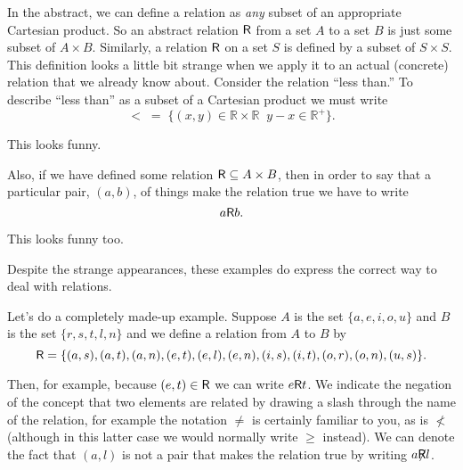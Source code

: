 \documentclass[10pt,]{book}
\theoremstyle{plain}
\theoremstyle{definition}
\theoremstyle{definition}
\numberwithin{equation}{section}
\newcommand{\suchthat}{\;  \;}
\newcommand{\Reals}{{\mathbb R}}
\newcommand{\relR}{\mbox{\textsf R}}
\newcommand{\nrelR}{\mbox{$\not${\textsf R}}}
\newcommand{\lt}{ < }
\begin{document}
    In the abstract, we can define a relation as \emph{any} subset of an
    appropriate Cartesian product. So an abstract relation \(\relR\) from a set
    \(A\) to a set \(B\) is just some subset of \(A \times B\). Similarly, a
    relation \(\relR\) on a set \(S\) is defined by a subset of \(S \times S\).
    This definition looks a little bit strange when we apply it to an
    actual (concrete) relation that we already know about. Consider the
    relation ``less than.'' To describe ``less than'' as a subset of
    a Cartesian product we must write
    \begin{equation*}
      \lt  \; = \; \{ (x,y) \in \Reals \times \Reals \suchthat y-x \in \Reals^+ \}.
    \end{equation*}
\par

    This looks funny.
\par

    Also, if we have defined some relation \(\relR \subseteq A \times B\), then in order
    to say that a particular pair, \((a,b)\), of things make the relation true we
    have to write
    \begin{equation*}
      a\relR b.
    \end{equation*}
\par

    This looks funny too.
\par

    Despite the strange appearances, these
    examples do express the correct way to deal with relations.
\par

    Let's do a completely made-up example. Suppose \(A\) is the set
    \(\{a,e,i,o,u\}\) and \(B\) is the set \(\{r,s,t,l,n\}\) and we define
    a relation from \(A\) to \(B\) by
    \begin{equation*}
      \relR = \{ (a,s), (a,t), (a,n), (e,t), (e,l), (e,n), (i,s), (i,t), (o,r), (o,n), (u,s) \}.
    \end{equation*}
\par

    Then, for example, because \((e,t) \in \relR\) we can write \(e \relR t\). We indicate the
    negation of the concept that two elements are related by drawing a slash
    through the name of the relation, for example the notation \(\neq\) is certainly
    familiar to you, as is \(\nless\) (although in this latter case we
    would normally write \(\geq\) instead). We can denote the fact that
    \((a,l)\) is not a pair that makes the relation true by writing \(a \nrelR l\).
\par
\end{document}
